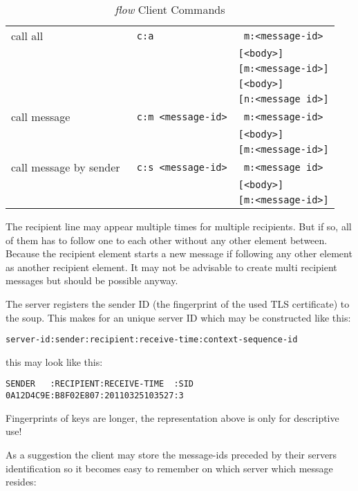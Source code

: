 \documentclass[twoside,a4paper,english,12pt,authoryear,openright]{book}
\newcommand{\flow}{\textit{flow} }
\begin{document}
\begin{table}[htdp]
\begin{center}
\begin{tabular}{ | l | l | l |  }
call all  & \texttt{ c:a}  &  \texttt{ m:<message-id>}  \\
&& \texttt{[<body>]}  \\
&&  \texttt{[m:<message-id>]}  \\
&& \texttt{[<body>]}  \\
&& \texttt{[n:<message id>]} \\
\hline

call message  & \texttt{ c:m <message-id>}  &  \texttt{ m:<message-id>}  \\
&& \texttt{[<body>]}  \\
&&  \texttt{[m:<message-id>]}  \\
\hline

call message by sender & \texttt{ c:s <message-id>}  & \texttt{ m:<message id>}  \\
&& \texttt{[<body>]}  \\
&&  \texttt{[m:<message-id>]}  \\
\hline


\end{tabular}
\end{center}
\caption{\flow Client Commands}
\label{default}
\end{table} %

The recipient line may appear multiple times for multiple recipients. But if so, all of them has to follow one to each other without any other element between. Because the recipient element starts a new message if following any other element as another recipient element. It may not be advisable to create multi recipient messages but should be possible anyway.

The server registers the sender ID (the fingerprint of the used TLS certificate) to the soup. This makes for an unique server ID which may be constructed like this:

\texttt{server-id:sender:recipient:receive-time:context-sequence-id}

this may look like this:

\begin{lstlisting}
SENDER   :RECIPIENT:RECEIVE-TIME  :SID
0A12D4C9E:B8F02E807:20110325103527:3
\end{lstlisting}

Fingerprints of keys are longer, the representation above is only for descriptive use!

As a suggestion the client may store the message-ids preceded  by their servers identification so it becomes easy to remember on which server which message resides: 
\end{document}
